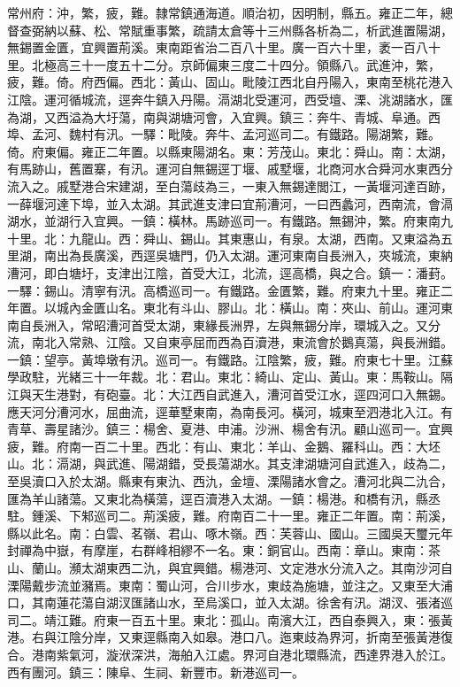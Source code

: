 \begin{pinyinscope}
常州府：沖，繁，疲，難。隸常鎮通海道。順治初，因明制，縣五。雍正二年，總督查弼納以蘇、松、常賦重事繁，疏請太倉等十三州縣各析為二，析武進置陽湖，無錫置金匱，宜興置荊溪。東南距省治二百八十里。廣一百六十里，袤一百八十里。北極高三十一度五十二分。京師偏東三度二十四分。領縣八。武進沖，繁，疲，難。倚。府西偏。西北：黃山、固山。毗陵江西北自丹陽入，東南至桃花港入江陰。運河循城流，逕奔牛鎮入丹陽。滆湖北受運河，西受壇、溧、洮湖諸水，匯為湖，又西溢為大圩蕩，南與湖塘河會，入宜興。鎮三：奔牛、青城、阜通。西埠、孟河、魏村有汛。一驛：毗陵。奔牛、孟河巡司二。有鐵路。陽湖繁，難。倚。府東偏。雍正二年置。以縣東陽湖名。東：芳茂山。東北：舜山。南：太湖，有馬跡山，舊置寨，有汛。運河自無錫逕丁堰、戚墅堰，北商河水合舜河水東西分流入之。戚墅港合宋建湖，至白蕩歧為三，一東入無錫達閭江，一黃堰河達百跡，一薛堰河達下埠，並入太湖。其武進支津曰宜荊漕河，一曰西蠡河，西南流，會滆湖水，並湖行入宜興。一鎮：橫林。馬跡巡司一。有鐵路。無錫沖，繁。府東南九十里。北：九龍山。西：舜山、錫山。其東惠山，有泉。太湖，西南。又東溢為五里湖，南出為長廣溪，西逕吳塘門，仍入太湖。運河東南自長洲入，夾城流，東納漕河，即白塘圩，支津出江陰，首受大江，北流，逕高橋，與之合。鎮一：潘葑。一驛：錫山。清寧有汛。高橋巡司一。有鐵路。金匱繁，難。府東九十里。雍正二年置。以城內金匱山名。東北有斗山、膠山。北：橫山。南：夾山、前山。運河東南自長洲入，常昭漕河首受太湖，東緣長洲界，左與無錫分岸，環城入之。又分流，南北入常熟、江陰。又自東亭屈而西為百瀆港，東流會於鵝真蕩，與長洲錯。一鎮：望亭。黃埠墩有汛。巡司一。有鐵路。江陰繁，疲，難。府東七十里。江蘇學政駐，光緒三十一年裁。北：君山。東北：綺山、定山、黃山。東：馬鞍山。隔江與天生港對，有砲臺。北：大江西自武進入，漕河首受江水，逕四河口入無錫。應天河分漕河水，屈曲流，逕華墅東南，為南長河。橫河，城東至泗港北入江。有青草、壽星諸沙。鎮三：楊舍、夏港、申浦。沙洲、楊舍有汛。顧山巡司一。宜興疲，難。府南一百二十里。西北：有山、東北：羊山、金鵝、羅科山。西：大坯山。北：滆湖，與武進、陽湖錯，受長蕩湖水。其支津湖塘河自武進入，歧為二，至吳瀆口入於太湖。縣東有東氿、西氿，金壇、溧陽諸水會之。漕河北與二氿合，匯為羊山諸蕩。又東北為橫蕩，逕百瀆港入太湖。一鎮：楊港。和橋有汛，縣丞駐。鍾溪、下邾巡司二。荊溪疲，難。府南百二十一里。雍正二年置。南：荊溪，縣以此名。南：白雲、茗嶺、君山、啄木嶺。西：芙蓉山、國山。三國吳天璽元年封禪為中嶽，有摩崖，右群峰相繆不一名。東：銅官山。西南：章山。東南：茶山、蘭山。瀕太湖東西二氿，與宜興錯。楊港河、文定港水分流入之。其南沙河自溧陽戴步流並瀦焉。東南：蜀山河，合川步水，東歧為施塘，並注之。又東至大浦口，其南蓮花蕩自湖汊匯諸山水，至烏溪口，並入太湖。徐舍有汛。湖汊、張渚巡司二。靖江難。府東一百五十里。東北：孤山。南濱大江，西自泰興入，東：張黃港。右與江陰分岸，又東逕縣南入如皋。港口八。迤東歧為界河，折南至張黃港復合。港南紫氣河，漩洑深洪，海舶入江處。界河自港北環縣流，西達界港入於江。西有團河。鎮三：陳阜、生祠、新豐市。新港巡司一。


\end{pinyinscope}
